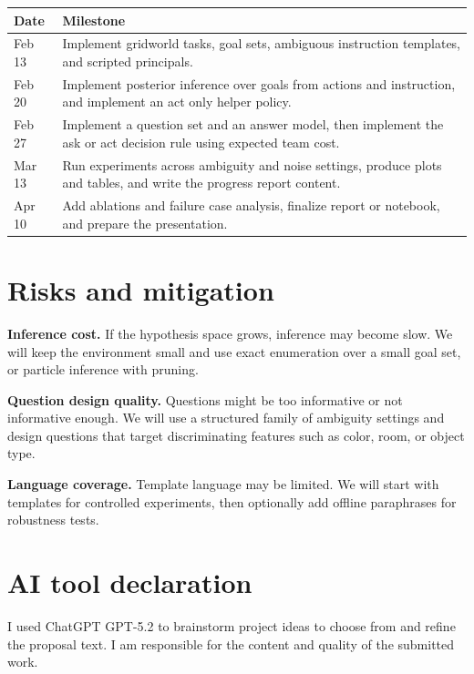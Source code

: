 \documentclass[10pt,twocolumn]{article}
\begin{document}
\begin{center}
\begin{tabular}{p{} p{}}
\toprule
\textbf{Date} & \textbf{Milestone} \\
\midrule
Feb 13 & Implement gridworld tasks, goal sets, ambiguous instruction templates, and scripted principals. \\
Feb 20 & Implement posterior inference over goals from actions and instruction, and implement an act only helper policy. \\
Feb 27 & Implement a question set and an answer model, then implement the ask or act decision rule using expected team cost. \\
Mar 13 & Run experiments across ambiguity and noise settings, produce plots and tables, and write the progress report content. \\
Apr 10 & Add ablations and failure case analysis, finalize report or notebook, and prepare the presentation. \\
\bottomrule
\end{tabular}
\end{center}

\section*{Risks and mitigation}
\textbf{Inference cost.}
If the hypothesis space grows, inference may become slow.
We will keep the environment small and use exact enumeration over a small goal set, or particle inference with pruning.

\textbf{Question design quality.}
Questions might be too informative or not informative enough.
We will use a structured family of ambiguity settings and design questions that target discriminating features such as color, room, or object type.

\textbf{Language coverage.}
Template language may be limited.
We will start with templates for controlled experiments, then optionally add offline paraphrases for robustness tests.

\section*{AI tool declaration}
I used ChatGPT GPT-5.2 to brainstorm project ideas to choose from and refine the proposal text. I am responsible for the content and quality of the submitted work.



\end{document}
